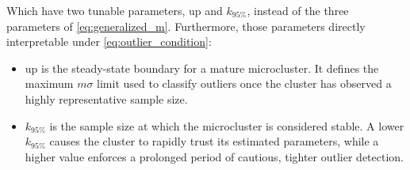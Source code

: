 Which have two tunable parameters, $\text{up}$ and $k_{95\%}$, instead of the three parameters of \cref{eq:generalized_m}. Furthermore, those parameters directly interpretable under \cref{eq:outlier_condition}:

\begin{itemize}
    \item $\text{up}$ is the steady-state boundary for a mature microcluster. It defines the maximum $m\sigma$ limit used to classify outliers once the cluster has observed a highly representative sample size.
    \item $k_{95\%}$ is the sample size at which the microcluster is considered stable. A lower $k_{95\%}$ causes the cluster to rapidly trust its estimated parameters, while a higher value enforces a prolonged period of cautious, tighter outlier detection.
\end{itemize}











